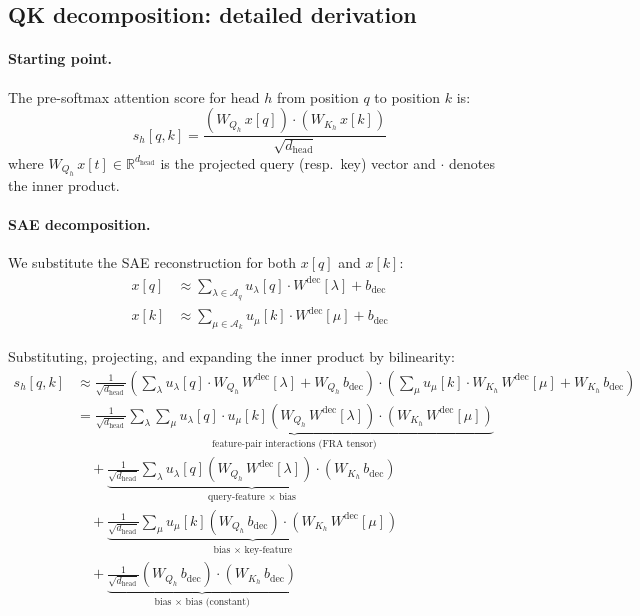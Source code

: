 \documentclass{article}
\theoremstyle{plain}
\theoremstyle{definition}
\theoremstyle{remark}
\newcommand{\Wdec}{W^{\mathrm{dec}}}
\newcommand{\dhead}{d_{\mathrm{head}}}
\newcommand{\ulambda}{u_\lambda}
\newcommand{\umu}{u_\mu}
\newcommand{\RR}{\mathbb{R}}
\begin{document}
\subsection{QK decomposition: detailed derivation}
\label{app:qk_derivation}

\paragraph{Starting point.} The pre-softmax attention score for head $h$ from position $q$ to position $k$ is:
\begin{equation}
    s_h[q,k] = \frac{\left(W_{Q_h}\,x[q]\right) \cdot \left(W_{K_h}\,x[k]\right)}{\sqrt{\dhead}}
\end{equation}
where $W_{Q_h}\,x[t] \in \RR^{\dhead}$ is the projected query (resp.\ key) vector and $\cdot$ denotes the inner product.

\paragraph{SAE decomposition.} We substitute the SAE reconstruction for both $x[q]$ and $x[k]$:
\begin{align}
    x[q] &\approx \sum_{\lambda \in \mathcal{A}_q} \ulambda[q] \cdot \Wdec[\lambda] + b_{\mathrm{dec}} \\
    x[k] &\approx \sum_{\mu \in \mathcal{A}_k} \umu[k] \cdot \Wdec[\mu] + b_{\mathrm{dec}}
\end{align}

Substituting, projecting, and expanding the inner product by bilinearity:
\begin{align}
    s_h[q,k] &\approx \frac{1}{\sqrt{\dhead}} \left( \sum_\lambda \ulambda[q] \cdot W_{Q_h}\,\Wdec[\lambda] + W_{Q_h}\,b_{\mathrm{dec}} \right) \cdot \left( \sum_\mu \umu[k] \cdot W_{K_h}\,\Wdec[\mu] + W_{K_h}\,b_{\mathrm{dec}} \right) \\
    &= \underbrace{\frac{1}{\sqrt{\dhead}} \sum_\lambda \sum_\mu \ulambda[q] \cdot \umu[k] \left( W_{Q_h}\,\Wdec[\lambda] \right) \cdot \left( W_{K_h}\,\Wdec[\mu] \right)}_{\text{feature-pair interactions (FRA tensor)}} \label{eq:app_fra_main} \\
    &\quad + \underbrace{\frac{1}{\sqrt{\dhead}} \sum_\lambda \ulambda[q] \left( W_{Q_h}\,\Wdec[\lambda] \right) \cdot \left( W_{K_h}\,b_{\mathrm{dec}} \right)}_{\text{query-feature $\times$ bias}} \label{eq:app_qbias} \\
    &\quad + \underbrace{\frac{1}{\sqrt{\dhead}} \sum_\mu \umu[k] \left( W_{Q_h}\,b_{\mathrm{dec}} \right) \cdot \left( W_{K_h}\,\Wdec[\mu] \right)}_{\text{bias $\times$ key-feature}} \label{eq:app_kbias} \\
    &\quad + \underbrace{\frac{1}{\sqrt{\dhead}} \left( W_{Q_h}\,b_{\mathrm{dec}} \right) \cdot \left( W_{K_h}\,b_{\mathrm{dec}} \right)}_{\text{bias $\times$ bias (constant)}} \label{eq:app_constbias}
\end{align}
\end{document}
